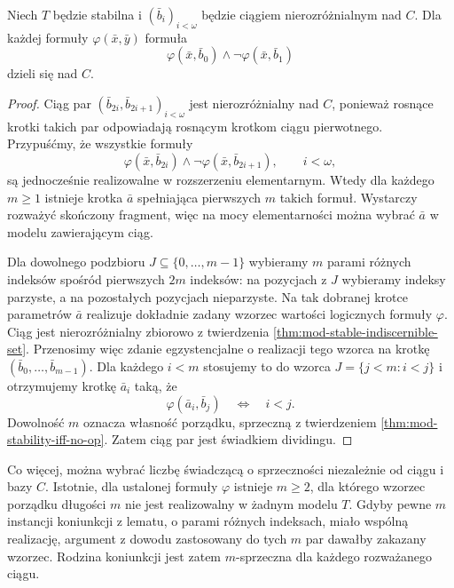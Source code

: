 \begin{lemat}
\label{lem:mod-stable-alternation-dividing}
Niech $T$ będzie stabilna i $(\bar b_i)_{i<\omega}$
będzie ciągiem nierozróżnialnym nad $C$.
Dla każdej formuły $\varphi(\bar x,\bar y)$
formuła
\[
\varphi(\bar x,\bar b_0)\land
\neg\varphi(\bar x,\bar b_1)
\]
dzieli się nad $C$.
\end{lemat}
\begin{proof}
Ciąg par $(\bar b_{2i},\bar b_{2i+1})_{i<\omega}$
jest nierozróżnialny nad $C$, ponieważ rosnące
krotki takich par odpowiadają rosnącym
krotkom ciągu pierwotnego.
Przypuśćmy, że wszystkie formuły
\[
\varphi(\bar x,\bar b_{2i})\land
\neg\varphi(\bar x,\bar b_{2i+1}),
\qquad i<\omega,
\]
są jednocześnie realizowalne w rozszerzeniu
elementarnym. Wtedy dla każdego $m\geq1$
istnieje krotka $\bar a$ spełniająca
pierwszych $m$ takich formuł. Wystarczy
rozważyć skończony fragment, więc na mocy
elementarności można wybrać $\bar a$ w modelu
zawierającym ciąg.

Dla dowolnego podzbioru $J\subseteq\{0,\ldots,m-1\}$
wybieramy $m$ parami różnych indeksów
spośród pierwszych $2m$ indeksów:
na pozycjach z $J$ wybieramy indeksy parzyste,
a na pozostałych pozycjach nieparzyste.
Na tak dobranej krotce parametrów $\bar a$
realizuje dokładnie zadany wzorzec wartości
logicznych formuły $\varphi$.
Ciąg jest nierozróżnialny zbiorowo z twierdzenia
\ref{thm:mod-stable-indiscernible-set}.
Przenosimy więc zdanie egzystencjalne
o realizacji tego wzorca na krotkę
$(\bar b_0,\ldots,\bar b_{m-1})$.
Dla każdego $i<m$ stosujemy to do wzorca
$J=\{j<m:i<j\}$ i otrzymujemy krotkę $\bar a_i$
taką, że
\[
\varphi(\bar a_i,\bar b_j)
\quad\Longleftrightarrow\quad i<j.
\]
Dowolność $m$ oznacza własność porządku,
sprzeczną z twierdzeniem
\ref{thm:mod-stability-iff-no-op}.
Zatem ciąg par jest świadkiem dividingu.
\end{proof}

Co więcej, można wybrać liczbę świadczącą
o sprzeczności niezależnie od ciągu i bazy $C$.
Istotnie, dla ustalonej formuły $\varphi$ istnieje
$m\geq2$, dla którego wzorzec porządku długości $m$
nie jest realizowalny w żadnym modelu $T$.
Gdyby pewne $m$ instancji koniunkcji z lematu,
o parami różnych indeksach, miało wspólną
realizację, argument z dowodu
zastosowany do tych $m$ par dawałby zakazany
wzorzec. Rodzina koniunkcji jest zatem
$m$-sprzeczna dla każdego rozważanego ciągu.

